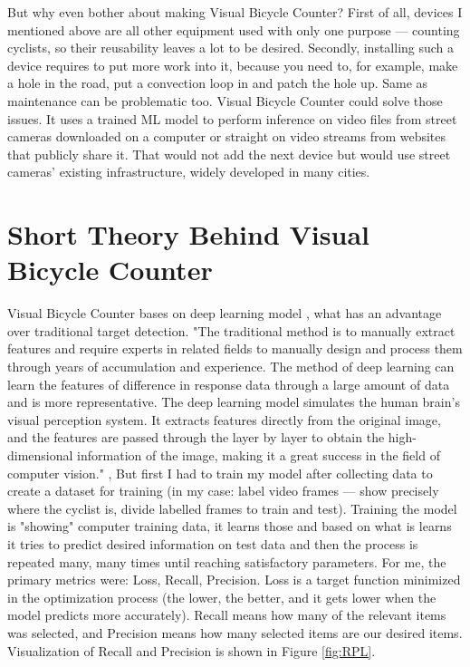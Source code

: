 But why even bother about making Visual Bicycle Counter? First of all, devices I mentioned above are all other equipment used with only one purpose --- counting cyclists, so their reusability leaves a lot to be desired. Secondly, installing such a device requires to put more work into it, because you need to, for example, make a hole in the road, put a convection loop in and patch the hole up. Same as maintenance can be problematic too. Visual Bicycle Counter could solve those issues. It uses a trained ML model to perform inference on video files from street cameras downloaded on a computer or straight on video streams from websites that publicly share it. That would not add the next device but would use street cameras' existing infrastructure, widely developed in many cities.

\section{Short Theory Behind Visual Bicycle Counter}
\label{sec:theory}

Visual Bicycle Counter bases on deep learning model \cite{deepLearning}, what has an advantage over traditional target detection. "The traditional method is to manually extract features and require experts in related fields to manually design and process them through years of accumulation and experience. The method of deep learning can learn the features of difference in response data through a large amount of data and is more representative. The deep learning model simulates the human brain's visual perception system. It extracts features directly from the original image, and the features are passed through the layer by layer to obtain the high-dimensional information of the image, making it a great success in the field of computer vision." \cite{deepLearning}, But first I had to train my model after collecting data to create a dataset for training (in my case: label video frames --- show precisely where the cyclist is, divide labelled frames to train and test). Training the model is "showing" computer training data, it learns those and based on what is learns it tries to predict desired information on test data and then the process is repeated many, many times until reaching satisfactory parameters. For me, the primary metrics were: Loss, Recall, Precision. Loss is a target function minimized in the optimization process (the lower, the better, and it gets lower when the model predicts more accurately). Recall means how many of the relevant items was selected, and Precision means how many selected items are our desired items. Visualization of Recall and Precision is shown in Figure \ref{fig:RPL}.

